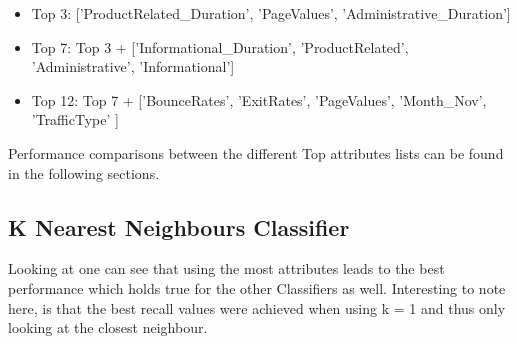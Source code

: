\begin{itemize}
    \item Top 3: ['ProductRelated\_Duration', 'PageValues', 'Administrative\_Duration']
    \item Top 7: Top 3 + ['Informational\_Duration',  'ProductRelated', 'Administrative', 'Informational']
    \item Top 12: Top 7 +  ['BounceRates', 'ExitRates', 'PageValues', 'Month\_Nov', 'TrafficType' ]      
\end{itemize}
Performance comparisons between the different Top attributes lists can be found in the following sections.  



\subsection{K Nearest Neighbours Classifier}
Looking at  one can see that using the most attributes leads to the best performance which holds true for the other Classifiers as well. Interesting to note here, is that the best recall values were achieved when using k = 1 and thus only looking at the closest neighbour. 

